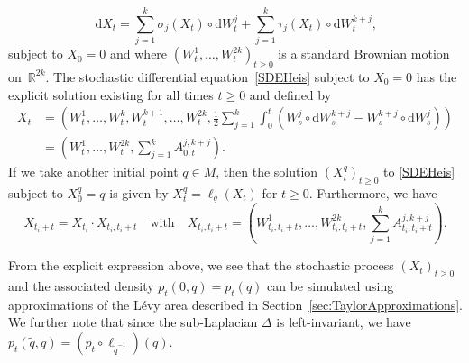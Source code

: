 \documentclass[10pt]{amsart}
\theoremstyle{remark}
\newcommand{\R}{\mathbb{R}}
\newcommand{\dd}{\,{\mathrm d}}
\newcommand{\db}{{\mathrm d}}
\numberwithin{equation}{section}
\begin{document}
\begin{equation} \label{SDEHeis} \dd X_t = \sum_{j=1}^k \sigma_j(X_t) \circ  \db W^j_t + \sum_{j=1}^k \tau_j(X_t) \circ \db W^{k+j}_t,\end{equation}
subject to $X_0=0$ and where $(W_t^1, \dots, W^{2k}_t)_{t\geq 0}$ is a standard Brownian motion on~$\R^{2k}$. The stochastic differential equation~\eqref{SDEHeis} subject to $X_0=0$ has the explicit solution existing for all times $t\geq 0$ and defined by
\begin{align*}
X_t & = \left(W_t^1, \dots, W^k_t, W^{k+1}_t,\dots,W_t^{2k}, \frac{1}{2} \sum_{j=1}^k \int_0^t (W^{j}_s \circ \db W_s^{k+j} - W^{k+j}_s \circ \db W_s^{j})  \right) \\
& = \left(W_t^{1}, \dots, W_t^{2k}, \sum_{j=1}^k A^{j,k+j}_{0,t} \right).
\end{align*}
If we take another initial point $q \in M$, then the solution $(X_t^{q})_{t\geq 0}$ to \eqref{SDEHeis} subject to $X_0^q=q$ is given by $X_t^{q} = \ell_{q}(X_t)$ for $t\geq 0$. Furthermore, we have
$$X_{t_i +t} = X_{t_i} \cdot X_{t_i,t_i+t} \quad\text{with}\quad X_{t_i,t_i+t} = \left(W_{t_i,t_i+t}^1,\dots, W_{t_i,t_i+t}^{2k}, \sum_{j=1}^k A_{t_i,t_i+t}^{j,k+j}\right).$$

From the explicit expression above, we see that the stochastic process $(X_t)_{t\geq 0}$ and the associated density $p_t(0,q) = p_t(q)$ can be simulated using approximations of the Lévy area described in Section~\ref{sec:TaylorApproximations}. We further note that since the sub-Laplacian $\Delta$ is left-invariant, we have $p_t(\tilde q, q) = (p_t \circ \ell_{\tilde q^{-1}})(q)$.
\end{document}
